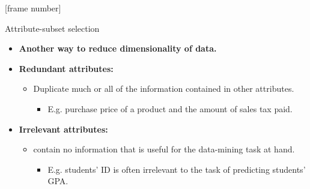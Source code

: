 \documentclass[aspectratio=169,t]{beamer}
\begin{document}
  {
    [frame number]
    \begin{frame}{Attribute-subset selection}
    \begin{itemize}
      \item \textbf{Another way to reduce dimensionality of data.}
      \item\textbf{\color{airforceblue}Redundant attributes:}
      \begin{itemize}
        \item Duplicate much or all of the information contained in other attributes.
        \begin{itemize}
          \item E.g. purchase price of a product and the amount of sales tax paid.
        \end{itemize}
      \end{itemize}
      \item \textbf{\color{airforceblue}Irrelevant attributes:}
      \begin{itemize}
        \item contain no information that is useful for the data-mining task at hand.
        \begin{itemize}
          \item E.g. students' ID is often irrelevant to the task of predicting students' GPA.
        \end{itemize}
      \end{itemize}
    \end{itemize}
    \end{frame}
  }
\end{document}
